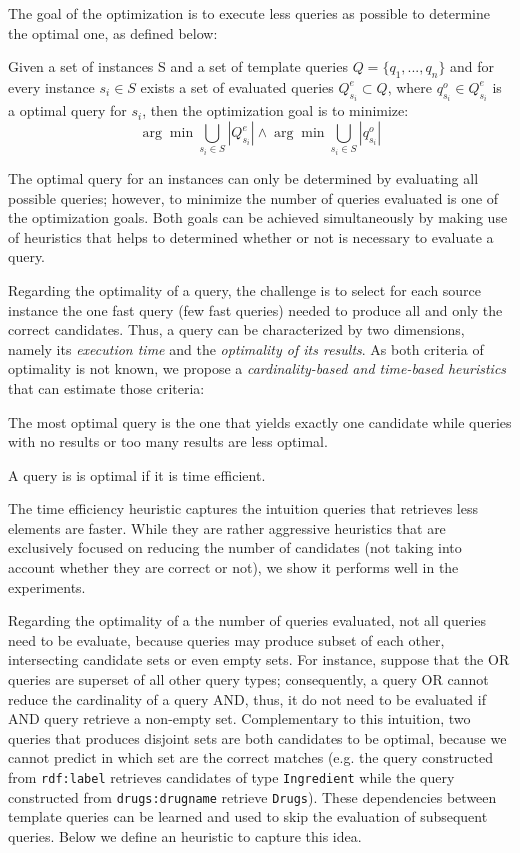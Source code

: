 The goal of the optimization is to execute less queries as possible to determine the optimal one, as defined below:
\begin{definition} Given a set of instances S and a set of template queries $Q =\{q_1,..., q_n\}$ and for every instance $s_i \in S$ exists a set of evaluated queries $Q^e_{s_i} \subset Q$, where $q^o_{s_i} \in Q^e_{s_i}$ is a optimal query for $s_i$, then the optimization goal is to minimize:
\[
{\arg \min} \bigcup_{s_i \in S}|Q^e_{s_i}| \land
{\arg \min} \bigcup_{s_i \in S} |q^o_{s_i}| 
\]
\end{definition} 

The optimal query for an instances can only be determined by evaluating all possible queries; however, to minimize the number of queries evaluated is one of the optimization goals. Both goals can be achieved simultaneously by making use of heuristics that helps to determined whether or not is necessary to evaluate a query.

Regarding the optimality of a query, the challenge is to select for each source instance the one fast query (few fast queries) needed to produce all and only the correct candidates. Thus, a query can be characterized by two dimensions, namely its \emph{execution time} and the \emph{optimality of its results}. As both criteria of optimality is not known, we propose a \emph{cardinality-based and time-based heuristics} that can estimate those criteria:

\begin{definition} The most optimal query is the one that yields exactly one candidate while queries with no results or too many results are less optimal. 
\end{definition} 
\begin{definition} A query is is optimal if it is time efficient.
\end{definition} 
The time efficiency heuristic captures the intuition queries that retrieves less elements are faster. While they are rather aggressive heuristics that are exclusively focused on reducing the number of candidates (not taking into account whether they are correct or not), we show it performs well in the experiments. 

Regarding the optimality of a the number of queries evaluated, not all queries need to be evaluate, because queries may produce subset of each other, intersecting candidate sets or even empty sets. For instance, suppose that the OR queries are superset of all other query types; consequently, a query OR cannot reduce the cardinality of a query AND, thus, it do not need to be evaluated if AND query retrieve a non-empty set. Complementary to this intuition, two queries that produces disjoint sets are both candidates to be optimal, because we cannot predict in which set are the correct matches (e.g. the query constructed from \verb+rdf:label+ retrieves candidates of type \verb+Ingredient+ while the query constructed from \verb+drugs:drugname+ retrieve \verb+Drugs+). These dependencies between template queries can be learned and used to skip the evaluation of subsequent queries.  Below we define an heuristic to capture this idea.

